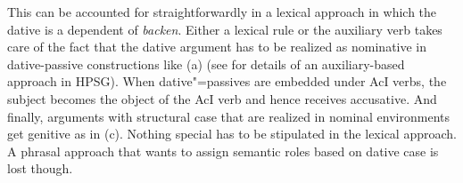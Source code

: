\zl
This can be accounted for straightforwardly in a lexical approach in which the dative is a dependent
of \emph{backen}. Either a lexical rule or the auxiliary verb takes care of the fact that the dative
argument has to be realized as nominative in dative-passive constructions like (a) (see
 for details of an auxiliary-based approach in HPSG). When
dative"=passives are embedded under AcI verbs, the subject becomes the object of the AcI verb and
hence receives accusative. And finally, arguments with structural case that are realized in nominal
environments get genitive as in (c). Nothing special has to be stipulated in the lexical
approach.
A phrasal approach that wants to assign semantic roles based on dative case is lost though.

